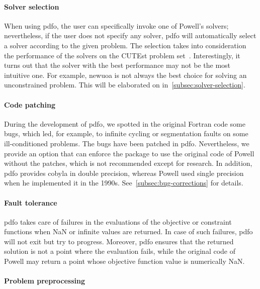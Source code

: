 \paragraph{Solver selection}

When using \gls{pdfo}, the user can specifically invoke one of Powell's solvers; nevertheless, if the user does not specify any solver, \gls{pdfo} will automatically select a solver according to the given problem.
The selection takes into consideration the performance of the solvers on the CUTEst problem set~\cite{Gould_Orban_Toint_2015}.
Interestingly, it turns out that the solver with the best performance may not be the most intuitive one.
For example, \gls{newuoa} is not always the best choice for solving an unconstrained problem.
This will be elaborated on in~\cref{subsec:solver-selection}.

\paragraph{Code patching}

During the development of \gls{pdfo}, we spotted in the original Fortran code some bugs, which led, for example, to infinite cycling or segmentation faults on some ill-conditioned problems.
The bugs have been patched in \gls{pdfo}.
Nevertheless, we provide an option that can enforce the package to use the original code of Powell without the patches, which is not recommended except for research.
In addition, \gls{pdfo} provides \gls{cobyla} in double precision, whereas Powell used single precision when he implemented it in the 1990s.
See~\cref{subsec:bug-corrections} for details.

\paragraph{Fault tolerance}

\Gls{pdfo} takes care of failures in the evaluations of the objective or constraint functions when NaN or infinite values are returned.
In case of such failures, \gls{pdfo} will not exit but try to progress.
Moreover, \gls{pdfo} ensures that the returned solution is not a point where the evaluation fails, while the original code of Powell may return a point whose objective function value is numerically NaN.

\paragraph{Problem preprocessing}


